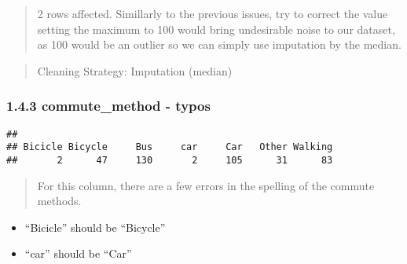 \documentclass[
]{article}
\newenvironment{Shaded}{\begin{snugshade}}{\end{snugshade}}
\newcommand{\CommentTok}[1]{\textcolor[rgb]{0.56,0.35,0.01}{\textit{#1}}}
\newcommand{\DecValTok}[1]{\textcolor[rgb]{0.00,0.00,0.81}{#1}}
\newcommand{\FunctionTok}[1]{\textcolor[rgb]{0.13,0.29,0.53}{\textbf{#1}}}
\newcommand{\NormalTok}[1]{#1}
\newcommand{\OtherTok}[1]{\textcolor[rgb]{0.56,0.35,0.01}{#1}}
\newcommand{\SpecialCharTok}[1]{\textcolor[rgb]{0.81,0.36,0.00}{\textbf{#1}}}
\providecommand{\tightlist}{%
  \setlength{\itemsep}{0pt}\setlength{\parskip}{0pt}}
\begin{document}
\begin{quote}
2 rows affected. Simillarly to the previous issues, try to correct the
value setting the maximum to 100 would bring undesirable noise to our
dataset, as 100 would be an outlier so we can simply use imputation by
the median.
\end{quote}

\begin{quote}
Cleaning Strategy: Imputation (median)
\end{quote}

\begin{Shaded}
\end{Shaded}

\subsubsection{1.4.3 commute\_method -
typos}\label{commute_method---typos}

\begin{Shaded}
\end{Shaded}

\begin{verbatim}
## 
## Bicicle Bicycle     Bus     car     Car   Other Walking 
##       2      47     130       2     105      31      83
\end{verbatim}

\begin{quote}
For this column, there are a few errors in the spelling of the commute
methods.
\end{quote}

\begin{itemize}
\tightlist
\item
  ``Bicicle'' should be ``Bicycle''
\item
  ``car'' should be ``Car''
\end{itemize}
\end{document}
